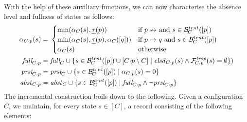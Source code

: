 \documentclass{article}
\begin{document}
%
With the help of these auxiliary functions, we can now characterise the absence level and fullness of states as follows:
%
\begin{align*}
\ALevel[\addp Cp](s) = {}
 & \begin{cases}
   \min(\ALevel[C](s),\pTLevel(p)) & \text{if } p\;{\nstepany} \text{ and } s\in \BackTrans[C]([p]) \\
   \min(\ALevel[C](s),\pTLevel(p),\ALevel[C]([q])) & \text{if } p\stepany q \text{ and } s\in \BackTrans[C]([p]) \\
   \ALevel[C](s) & \text{otherwise}
   \end{cases} \\
\Full[\addp Cp] = {}
  & \Full[C] \cup \gensetof{s\in \BackTrans[C]([p])\cup [\addp Cp\setminus C]}{\Closed[\addp Cp](s) \wedge \ForwTrOp[\addp Cp](s) = \emptyset}) \\
\Present[\addp Cp] = {}
  & \Present[C] \cup \gensetof{s\in \BackTrans[C]([p])}{\ALevel[\addp Cp](s) = 0} \\
\Absent[\addp Cp] = {}
  & \Absent[C] \cup \gensetof{s\in \BackTrans[C]([p])}{\Full[\addp Cp]\wedge \neg\Present[\addp Cp]}
\end{align*}
%
The incremental construction boils down to the following. Given a configuration $C$, we maintain, for every state $s\in [C]$, a record consisting of the following elements:
%
\end{document}
